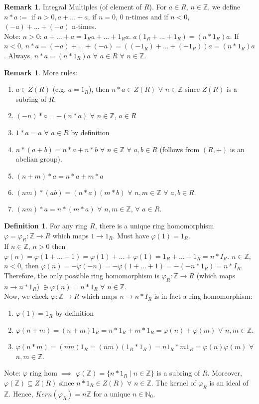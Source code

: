 \documentclass[11pt]{article}
\theoremstyle{definition}
\newtheorem{definition}[thm]{Definition}
\newtheorem{remark}[thm]{Remark}
\numberwithin{equation}{section}
\newcommand{\Z}{\mathbb{Z}}
\newcommand{\N}{\mathbb{N}} %
\begin{document}
\begin{remark}
Integral Multiples (of element of $R$). For $a \in R$, $n \in \Z$, we define $n*a := $ if $n > 0, a+...+a$, if $n = 0$, $0$ n-times and if $n < 0$, $(-a)+...+(-a)$ n-times.\\
Note: $n > 0$: $a+...+a = 1_{R}a+...+1_{R}a$. $a(1_{R}+...+1_{R}) = (n*1_{R})a$. If $n < 0$, $n*a = (-a)+...+(-a) = ((-1_{R})+...+(-1_{R}))a = (n*1_{R})a$. Always, $n*a = (n*1_{R})a$ $\forall$ $a \in R$ $\forall$ $n \in \Z$.\\
\end{remark}
\begin{remark}
More rules:\\
\begin{enumerate}
    \item $a \in Z(R)$ (e.g. $a = 1_{R}$), then $n*a \in Z(R)$ $\forall$ $n \in \Z$ since $Z(R)$ is a subring of $R$.
    \item $(-n)*a = -(n*a)$ $\forall$ $n \in \Z$, $a \in R$
    \item $1*a = a$ $\forall$ $a \in R$ by definition
    \item $n*(a+b) = n*a + n*b$ $\forall$ $n \in \Z$ $\forall$ $a, b \in R$ (follows from $(R, +)$ is an abelian group).
    \item $(n+m)*a = n*a + m*a$
    \item $(nm)*(ab) = (n*a)(m*b)$ $\forall$ $n, m \in \Z$ $\forall$ $a, b \in R$.
    \item $(nm)*a = n*(m*a)$ $\forall$ $n, m \in \Z$, $\forall$ $a \in R$.
\end{enumerate}
\end{remark}
\begin{definition}
For any ring $R$, there is a unique ring homomorphism $\varphi = \varphi_{R}: \Z \rightarrow R$ which maps $1 \rightarrow 1_{R}$. Must have $\varphi(1) = 1_{R}$.\\
If $n \in \Z$, $n > 0$ then $\varphi(n) = \varphi(1+...+1) = \varphi(1)+...+\varphi(1) = 1_{R}+...+1_{R} = n*I_{R}$. $n \in \Z$, $n < 0$, then $\varphi(n) = -\varphi(-n) = -\varphi(1+...+1) = -(-n*1_{R}) = n*I_{R}$. Therefore, the only possible ring homomorphism is $\varphi_{R}: \Z \rightarrow R$ (which maps $n \rightarrow n*1_{R}$) $\ni \varphi(n) = n*1_{R}$ $\forall$ $n \in \Z$.\\
Now, we check $\varphi: \Z \rightarrow R$ which maps $n \rightarrow n*I_{R}$ is in fact a ring homomorphism:
\begin{enumerate}
    \item $\varphi(1) = 1_{R}$ by definition
    \item $\varphi(n+m) = (n+m)1_{R} = n*1_{R} + m*1_{R} = \varphi(n) + \varphi(m)$ $\forall$ $n, m \in \Z$.
    \item $\varphi(n*m)=(nm)1_{R} = (nm)(1_{R}*1_{R}) = n1_{R} * m1_{R} = \varphi(n)\varphi(m)$ $\forall$ $n, m \in \Z$.
\end{enumerate}
Note: $\varphi$ ring hom $\implies$ $\varphi(\Z) = \{n*1_{R} \mid n \in \Z\}$ is a subring of $R$. Moreover, $\varphi(\Z) \subseteq Z(R)$ since $n*1_{R} \in Z(R)$ $\forall$ $n \in \Z$. The kernel of $\varphi_{R}$ is an ideal of $\Z$. Hence, $Kern(\varphi_{R}) = n\Z$ for a unique $n \in \N_0$.
\end{definition}
\end{document}
